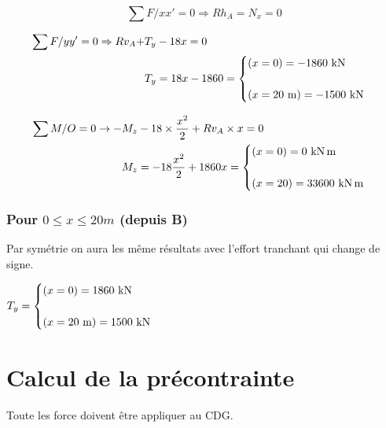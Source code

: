 \documentclass[12pt,a4paper]{article}
\begin{document}
	\[ \sum F/xx' = 0 \Rightarrow Rh_{A} = N_{x} = 0 \]
	
	\vspace{\baselineskip}
	
	\[ \begin{aligned}
		\sum F/yy' = 0 \Rightarrow Rv_{A} + &T_{y} - 18x = 0 \\
		&T_{y} = 18x - 1860 = \begin{cases}
			(x = 0) = -1860\kn \\ \\
			(x = 20\meterl) = -1500\kn
		\end{cases}
	\end{aligned} \]
	
	\vspace{\baselineskip}
	
	\[ \begin{aligned}
		\sum M/O = 0 \rightarrow -&M_{z} - 18 \times \dfrac{x^{2}}{2} + Rv_{A} \times x = 0 \\
		&M_{z} = -18\dfrac{x^{2}}{2} + 1860x = \begin{cases}
			(x = 0) = 0\knxm \\ \\
			(x = 20) = 33600\knxm
		\end{cases}
	\end{aligned} \]
	
	
	\subsubsection{Pour $0 \leq x \leq 20m$ (depuis B)}
	
	Par symétrie on aura les même résultats avec l'effort tranchant qui change de signe.
	
	$T_{y} = \begin{cases}
		(x = 0) = 1860\kn \\ \\
		(x = 20\meterl) = 1500\kn
	\end{cases}$
	
	
	
	
	
	
	
	\section{Calcul de la précontrainte}
	
	
	\begin{tcolorbox}[colback=gray!20, colframe=black, title=Remarque]
		Toute les force doivent être appliquer au CDG.
	\end{tcolorbox}
	
\end{document}
